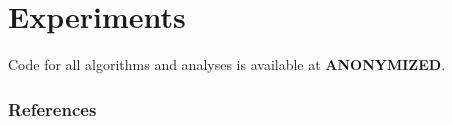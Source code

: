 \documentclass{article} %
\begin{document}
\section{Experiments}
Code for all algorithms and analyses is available at \textbf{ANONYMIZED}.

\subsubsection*{References}
\begingroup
\renewcommand{\section}[2]{}
{}

\endgroup
\end{document}
